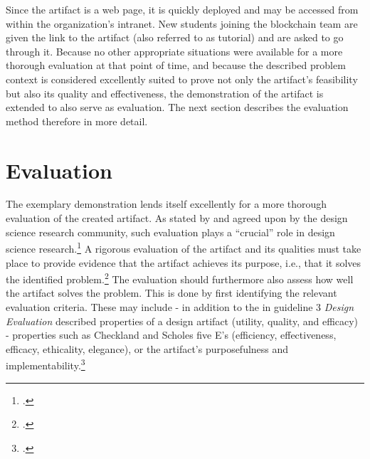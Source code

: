 Since the artifact is a web page, it is quickly deployed and may be accessed from within the organization's intranet. New students joining the blockchain team are given the link to the artifact (also referred to as tutorial) and are asked to go through it. Because no other appropriate situations were available for a more thorough evaluation at that point of time, and because the described problem context is considered excellently suited to prove not only the artifact's feasibility but also its quality and effectiveness, the demonstration of the artifact is extended to also serve as evaluation. The next section describes the evaluation method therefore in more detail.


\section{Evaluation} \label{sec:Evaluation}

The exemplary demonstration lends itself excellently for a more thorough evaluation of the created artifact. As stated by \cite{HevnerDesignScienceResearch2004} and agreed upon by the design science research community, such evaluation plays a \enquote{crucial} role in design science research.\footcites[Cf.][p.258]{MarchDesignnaturalscience1995}[Cf. in addition][]{PfeffersDesignScienceResearch2007}{HevnerDesignScienceResearch2004}{Pries-HejeComprehensiveFrameworkEvaluation2012}{Pries-HejeStrategiesDesignScience} A rigorous evaluation of the artifact and its qualities must take place to provide evidence that the artifact achieves its purpose, i.e., that it solves the identified problem.\footcites[Cf.][p.425]{Pries-HejeComprehensiveFrameworkEvaluation2012} The evaluation should furthermore also assess how well the artifact solves the problem. This is done by first identifying the relevant evaluation criteria. These may include - in addition to the in guideline 3 \textit{Design Evaluation} described properties of a design artifact (utility, quality, and efficacy) - properties such as Checkland and Scholes five E's (efficiency, effectiveness, efficacy, ethicality, elegance), or the artifact's purposefulness and implementability.\footcites[Cf.][p.427]{Pries-HejeComprehensiveFrameworkEvaluation2012}[cf. in addition][]{ChecklandSoftSystemsMethodology1990}

